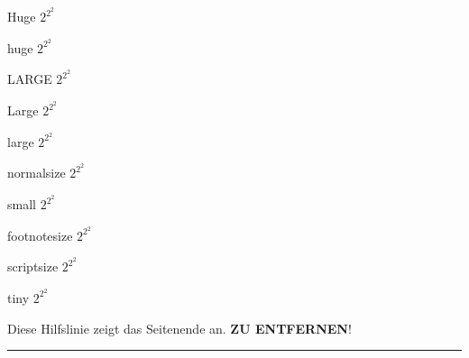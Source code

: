 \documentclass[a0paper,noDIN,MathematikA0]{tudmathposter}
\begin{document}

\Huge Huge $2^{2^2}$

\huge huge $2^{2^2}$

\LARGE LARGE  $2^{2^2}$

\Large Large $2^{2^2}$

\large large $2^{2^2}$

\normalsize normalsize $2^{2^2}$

\small small $2^{2^2}$

\footnotesize footnotesize $2^{2^2}$

\scriptsize scriptsize $2^{2^2}$

\tiny tiny $2^{2^2}$

\vfill
Diese Hilfslinie zeigt das Seitenende an. \textbf{ZU ENTFERNEN}!
\hrule
\end{document}

